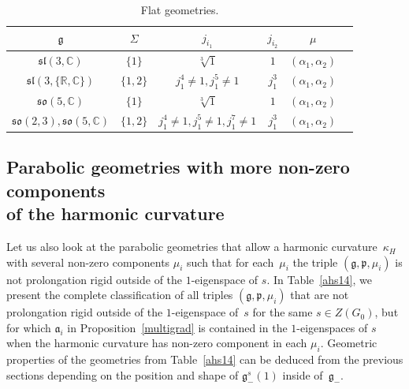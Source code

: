 \documentclass[pdftex]{sigma}
\newcommand{\fg}{\mathfrak g}
\newcommand{\fp}{\mathfrak p}
\numberwithin{equation}{section}
\begin{document}
\begin{table}[th!]\centering \caption{Flat geometries.}\label{ahs13}\vspace{1mm}

\begin{tabular}{|c|c|c|c|c|c|}
\hline
$\fg$ & $\Sigma$ & $j_{i_1}$& $j_{i_2}$& $\mu$ \\
\hline
\hline
$\mathfrak{sl}(3,\mathbb{C})$ & $\{1\}$&$\sqrt[3]{1}$&$1$&$(\alpha_{1},\alpha_2)$\\
\hline
$\mathfrak{sl}(3,\{\mathbb{R},\mathbb{C}\})$ & $\{1,2\}$&$j_1^4\neq1, j_1^5\neq 1$&$j_1^3$&$(\alpha_{1},\alpha_2)$\\
\hline
$\mathfrak{so}(5,\mathbb{C})$ & $\{1\}$&$\sqrt[3]{1}$&$1$&$(\alpha_{1},\alpha_2)$\\
\hline
$\mathfrak{so}(2,3), \mathfrak{so}(5,\mathbb{C})$ & $\{1,2\}$&$j_1^4\neq1, j_1^5\neq 1, j_1^7\neq 1$&$j_1^3$&$(\alpha_{1},\alpha_2)$\\
\hline
\end{tabular}
\end{table}

\subsection[Parabolic geometries with more non-zero components of the harmonic curvature]{Parabolic geometries with more non-zero components \\ of the harmonic curvature}

Let us also look at the parabolic geometries that allow a harmonic curvature~$\kappa_H$ with several non-zero components $\mu_i$ such that for each~$\mu_i$ the triple $(\fg,\fp,\mu_i)$ is not prolongation rigid outside of the $1$-eigenspace of $s$. In Table~\ref{ahs14}, we present the complete classif\/ication of all triples $(\fg,\fp,\mu_i)$ that are not prolongation rigid outside of the $1$-eigenspace of~$s$ for the same $s\in Z(G_0)$, but for which $\mathfrak{a}_i$ in Proposition~\ref{multigrad} is contained in the $1$-eigenspaces of $s$ when the harmonic curvature has non-zero component in each $\mu_i$. Geometric properties of the geometries from Table~\ref{ahs14} can be deduced from the previous sections depending on the position and shape of $\fg_{-}^s(1)$ inside of~$\fg_-$.
\end{document}

